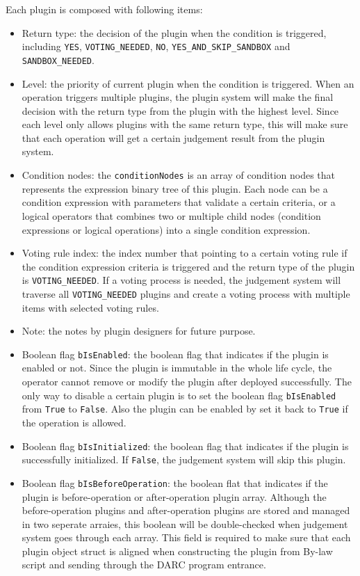 \documentclass[main.tex]{subfiles}
\begin{document}
Each plugin is composed with following items:
\begin{itemize}
\item Return type: the decision of the plugin when the condition is triggered, including \texttt{YES}, \texttt{VOTING\_NEEDED}, \texttt{NO}, \texttt{YES\_AND\_SKIP\_SANDBOX} and \texttt{SANDBOX\_NEEDED}.
\item Level: the priority of current plugin when the condition is triggered. When an operation triggers multiple plugins, the plugin system will make the final decision with the return type from the plugin with the highest level. Since each level only allows plugins with the same return type, this will make sure that each operation will get a certain judgement result from the plugin system.
\item Condition nodes: the \texttt{conditionNodes} is an array of condition nodes that represents the expression binary tree of this plugin. Each node can be a condition expression with parameters that validate a certain criteria, or a logical operators that combines two or multiple child nodes (condition expressions or logical operations) into a single condition expression. 
\item Voting rule index: the index number that pointing to a certain voting rule if the condition expression criteria is triggered and the return type of the plugin is \texttt{VOTING\_NEEDED}. If a voting process is needed, the judgement system will traverse all \texttt{VOTING\_NEEDED} plugins and create a voting process with multiple items with selected voting rules.
\item Note: the notes by plugin designers for future purpose.
\item Boolean flag \texttt{bIsEnabled}: the boolean flag that indicates if the plugin is enabled or not. Since the plugin is immutable in the whole life cycle, the operator cannot remove or modify the plugin after deployed successfully. The only way to disable a certain plugin is to set the boolean flag \texttt{bIsEnabled} from \texttt{True} to \texttt{False}. Also the plugin can be enabled by set it back to \texttt{True} if the operation is allowed.
\item Boolean flag \texttt{bIsInitialized}: the boolean flag that indicates if the plugin is successfully initialized. If \texttt{False}, the judgement system will skip this plugin.
\item Boolean flag \texttt{bIsBeforeOperation}: the boolean flat that indicates if the plugin is before-operation or after-operation plugin array. Although the before-operation plugins and after-operation plugins are stored and managed in two seperate arraies, this boolean will be double-checked when judgement system goes through each array. This field is required to make sure that each plugin object struct is aligned when constructing the plugin from By-law script and sending through the DARC program entrance.

\end{itemize}
\end{document}
